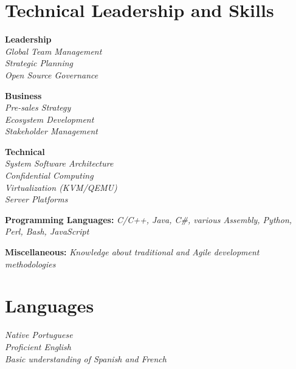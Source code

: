 \documentclass[10pt]{article} %
\begin{document}

\section{Technical Leadership and Skills}

\begin{minipage}[t]{0.33\textwidth}

\textbf{Leadership} \\
\textit{Global Team Management \\ Strategic Planning \\ Open Source
Governance}

\end{minipage}
\begin{minipage}[t]{0.33\textwidth}

\textbf{Business} \\
\textit{Pre-sales Strategy \\ Ecosystem Development \\ Stakeholder Management}

\end{minipage}
\begin{minipage}[t]{0.33\textwidth}

\textbf{Technical} \\
\textit{System Software Architecture \\ Confidential Computing \\ Virtualization (KVM/QEMU) \\ Server Platforms}

\end{minipage}

\vspace{1em}

\textbf{Programming Languages: } \textit{C/C++, Java, C\#,  various Assembly, Python, Perl, Bash, JavaScript}

\smallskip

\textbf{Miscellaneous:} \textit{Knowledge about traditional and Agile development methodologies}


\section{Languages}

\textit{Native Portuguese} \\
\textit{Proficient English} \\
\textit{Basic understanding of Spanish and French}
\end{document}
